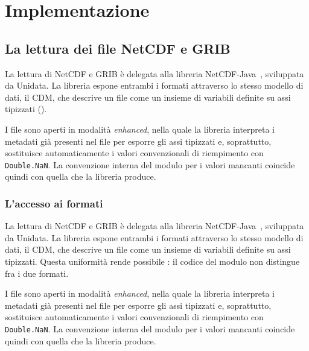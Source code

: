 \chapter{Implementazione}
\label{chap:implementazione}

\section{La lettura dei file NetCDF e GRIB}
\label{sec:rappresentazione-impl}

La lettura di \ac{NetCDF} e \ac{GRIB} è delegata alla libreria NetCDF-Java~\cite{netcdfjava},
sviluppata da Unidata. La libreria espone entrambi i formati attraverso lo stesso modello
di dati, il \ac{CDM}, che descrive un file come un insieme di variabili definite su assi
tipizzati ().

I file sono aperti in modalità \emph{enhanced}, nella quale la libreria interpreta i metadati
già presenti nel file per esporre gli assi tipizzati e, soprattutto, sostituisce
automaticamente i valori convenzionali di riempimento con \texttt{Double.NaN}. La
convenzione interna del modulo per i valori mancanti coincide quindi con quella che la
libreria produce.

\iffalse
\subsection{L'accesso ai formati}
\label{subsec:formati-impl}

La lettura di \ac{NetCDF} e \ac{GRIB} è delegata alla libreria NetCDF-Java~\cite{netcdfjava},
sviluppata da Unidata. La libreria espone entrambi i formati attraverso lo stesso modello
di dati, il \ac{CDM}, che descrive un file come un insieme di variabili definite su assi
tipizzati. Questa uniformità rende possibile : il codice del modulo non distingue
fra i due formati.

I file sono aperti in modalità \emph{enhanced}, nella quale la libreria interpreta i metadati
già presenti nel file per esporre gli assi tipizzati e, soprattutto, sostituisce
automaticamente i valori convenzionali di riempimento con \texttt{Double.NaN}. La
convenzione interna del modulo per i valori mancanti coincide quindi con quella che la
libreria produce.

